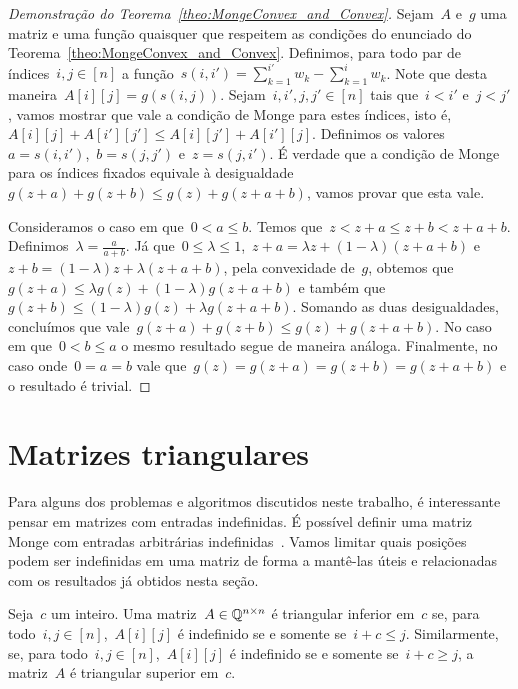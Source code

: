 \begin{proof}[Demonstração do Teorema~\ref{theo:MongeConvex_and_Convex}]
Sejam~$A$ e~$g$ uma matriz e uma função quaisquer que respeitem as condições do enunciado do Teorema~\ref{theo:MongeConvex_and_Convex}. Definimos, para todo par de índices~${ i,j \in [n] }$ a função~${ s(i,i') = \sum\limits_{k=1}^{i'} w_k - \sum\limits_{k=1}^i w_k }$. Note que desta maneira~${ A[i][j] = g(s(i,j)) }$. Sejam~${ i,i',j,j' \in [n] }$ tais que~${ i < i' }$ e~${ j < j' }$, vamos mostrar que vale a condição de Monge para estes índices, isto é,~${ A[i][j] + A[i'][j'] \leq A[i][j'] + A[i'][j] }$. Definimos os valores~${ a = s(i,i') }$,~${ b = s(j,j') }$ e~${ z = s(j,i') }$. É verdade que a condição de Monge para os índices fixados equivale à desigualdade~${ g(z+a) + g(z+b) \leq g(z) + g(z+a+b) }$, vamos provar que esta vale.

Consideramos o caso em que~${ 0 < a \leq b }$. Temos que~${ z < z+a \leq z + b < z + a + b }$. Definimos~${ \lambda = \frac{a}{a+b} }$. Já que~${ 0 \leq \lambda \leq 1 }$,~${ z + a = \lambda z + (1 - \lambda)(z+a+b) }$ e~${ z + b = (1 - \lambda)z + \lambda(z+a+b) }$, pela convexidade de~$g$, obtemos que~${ g(z+a) \leq \lambda g(z) + (1 - \lambda)g(z+a+b) }$ e também que~${ g(z+b) \leq (1-\lambda) g(z) + \lambda g(z+a+b) }$. Somando as duas desigualdades, concluímos que vale~${ g(z+a) + g(z+b) \leq g(z) + g(z+a+b) }$. No caso em que~${ 0 < b \leq a }$ o mesmo resultado segue de maneira análoga. Finalmente, no caso onde~${ 0 = a = b }$ vale que~${ g(z) = g(z+a) = g(z+b) = g(z+a+b) }$ e o resultado é trivial.
\end{proof}


\section{Matrizes triangulares} \label{Monge:Triangular} 

Para alguns dos problemas e algoritmos discutidos neste trabalho, é interessante pensar em matrizes com entradas indefinidas. É possível definir uma matriz Monge com entradas arbitrárias indefinidas~\cite[Seção 9.4]{Burkard:1996}. Vamos limitar quais posições podem ser indefinidas em uma matriz de forma a mantê-las úteis e relacionadas com os resultados já obtidos nesta seção. 

\begin{defi}
Seja~$c$ um inteiro. Uma matriz~$A \in \mathbb{Q}^{n \times n}$ é triangular inferior em~$c$ se, para todo~${ i,j \in [n] }$,~$A[i][j]$ é indefinido se e somente se~${ i + c \leq j }$. Similarmente, se, para todo~${i,j \in [n]}$,~$A[i][j]$ é indefinido se e somente se~${ i + c \geq j }$, a matriz~$A$ é triangular superior em~$c$.
\end{defi}

